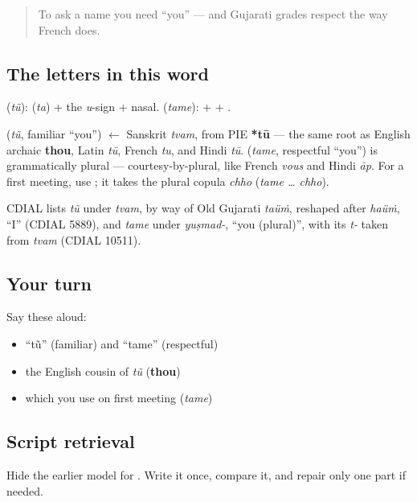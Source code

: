 \label{lesson:GU-C02-tu-tame}



\begin{quote}
To ask a name you need \textquotedblleft{}you\textquotedblright{} — and Gujarati grades respect the way French does.
\end{quote}

\subsection*{The letters in this word}
\textbf{} (\emph{tũ}): \textbf{} (\emph{ta}) + the \emph{u}-sign + nasal. \textbf{} (\emph{tame}): \textbf{} + \textbf{} + \textbf{}.

\begin{cousinweb}
\textbf{} (\emph{tũ}, familiar \textquotedblleft{}you\textquotedblright{}) $\leftarrow$ Sanskrit \emph{tvam}, from PIE \textbf{*tū} — the same root as English archaic \textbf{thou}, Latin \emph{tū}, French \emph{tu}, and Hindi \emph{tū}. \textbf{} (\emph{tame}, respectful \textquotedblleft{}you\textquotedblright{}) is grammatically plural — courtesy-by-plural, like French \emph{vous} and Hindi \emph{āp}. For a first meeting, use \textbf{}; it takes the plural copula \emph{chho} (\emph{tame … chho}).

CDIAL lists \emph{tũ} under \emph{tvam}, by way of Old Gujarati \emph{taüṁ}, reshaped after \emph{haüṁ}, \textquotedblleft{}I\textquotedblright{} (CDIAL 5889), and \emph{tame} under \emph{yuṣmad-}, \textquotedblleft{}you (plural)\textquotedblright{}, with its \emph{t-} taken from \emph{tvam} (CDIAL 10511).
\end{cousinweb}

\subsection*{Your turn}
Say these aloud:

\begin{itemize}
\raggedright
  \item \textquotedblleft{}tũ\textquotedblright{} (familiar) and \textquotedblleft{}tame\textquotedblright{} (respectful)
  \item the English cousin of \emph{tũ} (\textbf{thou})
  \item which you use on first meeting (\emph{tame})
\end{itemize}

\subsection*{Script retrieval}
Hide the earlier model for \textbf{}. Write it once, compare it, and repair only one part if needed.


